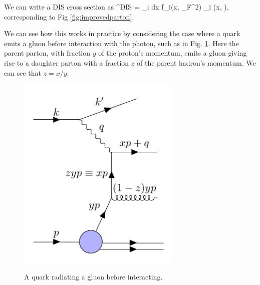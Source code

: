 We can write a DIS cross section as
\be
\label{eqn:disfact}
\sigma^{DIS} = \sum_i \int dx f_i(x, \mu_F^2) \hat{\sigma}_i \bigg(x,  \bigg),
\ee
corresponding to Fig \ref{fig:improvedparton}. 

We can see how this works in practice by considering the case where a quark emits a gluon before interaction with the photon, such as in Fig. \ref{fig:scalingviolation}. Here the parent parton, with fraction $y$ of the proton's momentum, emits a gluon giving rise to a daughter parton with a fraction $z$ of the parent hadron's momentum. We can see that $z = x/y$.

\begin{figure}[H]
\centering
\includegraphics[width=0.7\textwidth]{../diagrams/scalingviolation.pdf}
\label{fig:scalingviolation}
\caption{A quark radiating a gluon before interacting.}
\end{figure}

